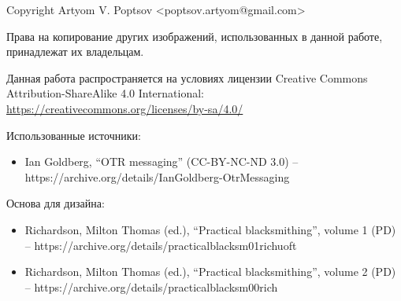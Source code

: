 \documentclass[presentation]{beamer}
\begin{document}
\begin{frame}{}
  Copyright  Artyom V. Poptsov
  <poptsov.artyom@gmail.com> \newline

  Права на копирование других изображений, использованных в данной
  работе, принадлежат их владельцам. \newline

  Данная работа распространяется на условиях лицензии Creative Commons
  Attribution-ShareAlike 4.0 International:
  \url{https://creativecommons.org/licenses/by-sa/4.0/}
\end{frame}

\begin{frame}{}
  Использованные источники:
  \begin{itemize}
  \item Ian Goldberg, ``OTR messaging'' (CC-BY-NC-ND 3.0) --
    https://archive.org/details/IanGoldberg-OtrMessaging
  \end{itemize}
  Основа для дизайна:
  \begin{itemize}
  \item Richardson, Milton Thomas (ed.), ``Practical blacksmithing'',
    volume 1 (PD) --
    https://archive.org/details/practicalblacksm01richuoft
  \item Richardson, Milton Thomas (ed.), ``Practical blacksmithing'',
    volume 2 (PD) -- https://archive.org/details/practicalblacksm00rich
  \end{itemize}
\end{frame}


\end{document}
